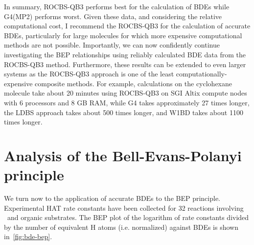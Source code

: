 \begin{doublespace}
In summary, ROCBS-QB3 performs best for the calculation of  BDEs while
G4(MP2) performs worst. Given these data, and considering the relative
computational cost, I recommend the ROCBS-QB3 for the calculation of accurate
BDEs, particularly for large molecules for which more expensive computational
methods are not possible. Importantly, we can now confidently continue
investigating the BEP relationships using reliably calculated BDE data from the
ROCBS-QB3 method. Furthermore, these results can be extended to even larger
systems as the ROCBS-QB3 approach is one of the least computationally-expensive
composite methods. For example, calculations on the cyclohexane molecule take
about 20 minutes using ROCBS-QB3 on SGI Altix compute nodes with 6 processors
and 8 GB RAM, while G4 takes approximately 27 times longer, the LDBS approach
takes about 500 times longer, and W1BD takes about 1100 times longer.

\section{Analysis of the Bell-Evans-Polanyi principle}

We turn now to the application of accurate BDEs to the BEP principle.
Experimental HAT rate constants have been collected for 32 reactions involving
\cumo\ and organic substrates. The BEP plot of the logarithm of rate constants
divided by the number of equivalent H atoms (i.e. normalized) against BDEs is
shown in~\ref{fig:bde-bep}.


\end{doublespace}
